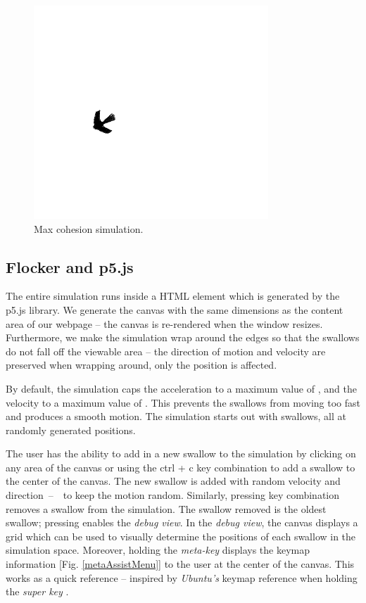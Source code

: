 \documentclass[../main]{subfiles}
\begin{document}
\begin{figure}
    \centering
	\includegraphics[scale=0.30, width=250pt, frame]{resources/flocker_max_cohesion.png}
	\caption{Max cohesion simulation.}
	\label{maxCohesionImg}
\end{figure}

\subsection{Flocker and p5.js}
\label{flocker_p5js}

The entire simulation runs inside a HTML  element which is generated by the p5.js library. We generate the canvas with the same dimensions as the content area of our webpage -- the canvas is re-rendered when the window resizes. Furthermore, we make the simulation wrap around the edges so that the swallows do not fall off the viewable area -- the direction of motion and velocity are preserved when wrapping around, only the position is affected.

By default, the simulation caps the acceleration to a maximum value of , and the velocity to a maximum value of . This prevents the swallows from moving too fast and produces a smooth motion. The simulation starts out with  swallows, all at randomly generated positions. 

The user has the ability to add in a new swallow to the simulation by clicking on any area of the canvas or using the {ctrl + c} key combination to add a swallow to the center of the canvas. The new swallow is added with random velocity and direction~--~~to keep the motion random. Similarly, pressing  key combination removes a swallow from the simulation. The swallow removed is the oldest swallow; pressing  enables the {\em debug view}. In the {\em debug view}, the canvas displays a grid which can be used to visually determine the positions of each swallow in the simulation space. Moreover, holding the  {\em meta-key} displays the keymap information [Fig. \ref{metaAssistMenu}] to the user at the center of the canvas. This works as a quick reference -- inspired by {\em Ubuntu's} keymap reference when holding the {\em super key} \cite{ubuntuOverlay}.
\end{document}
